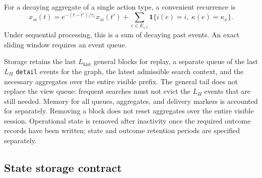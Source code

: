 \documentclass[12pt,a4paper]{article}
\newcommand{\code}[1]{{\ttfamily\small\nolinkurl{#1}}}
\newcommand{\ind}{\mathbf 1}
\theoremstyle{plainru}
\begin{document}
For a decaying aggregate of a single action type, a convenient
recurrence is
\begin{equation}\label{eq:ops-decay-update}
x_{si}(t)=e^{-(t-t')/\tau_x}x_{si}(t')+
\sum_{e\in E_{s,t}}\ind\{i(e)=i,\ \kappa(e)=\kappa_x\}.
\end{equation}
Under sequential processing, this is a sum of decaying past events.
An exact sliding window requires an event queue.

Storage retains the last \(L_{\mathrm{hist}}\) general blocks for replay,
a separate queue of the last $L_H$ \code{detail} events for the graph,
the latest admissible search context, and the necessary aggregates
over the entire visible prefix. The general tail does not replace the view queue:
frequent searches must not evict the $L_H$ events that are still needed.
Memory for all queues, aggregates, and delivery markers is accounted for separately.
Removing a block does not reset
aggregates over the entire visible session. Operational state is removed
after inactivity once the required outcome records have been written; state and outcome
retention periods are specified separately.

\subsection{State storage contract}
\label{sec:ops-state-storage}
\end{document}
